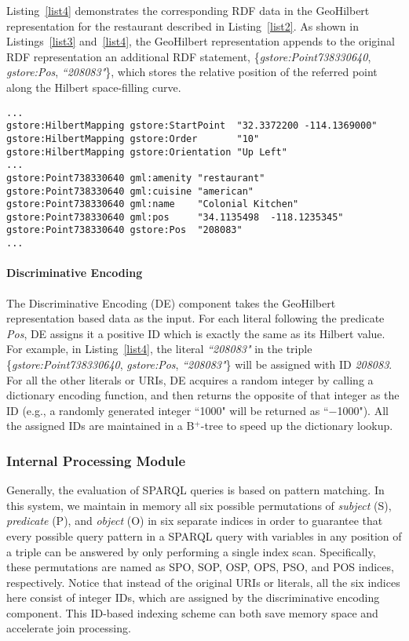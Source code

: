 Listing~\ref{list4} demonstrates the corresponding RDF data in the
GeoHilbert representation for the restaurant described in
Listing~\ref{list2}. As shown in Listings~\ref{list3}
and~\ref{list4}, the GeoHilbert representation appends to the
original RDF representation an additional RDF statement,
\{\emph{gstore:Point738330640}, \emph{gstore:Pos},
\emph{``208083"}\}, which stores the relative position of the
referred point along the Hilbert space-filling curve.


\begin{lstlisting}[caption={The GeoHilbert representation of the restaurant described in Listing~\ref{list2}.}, label={list4}]
...
gstore:HilbertMapping gstore:StartPoint  "32.3372200 -114.1369000"
gstore:HilbertMapping gstore:Order       "10"
gstore:HilbertMapping gstore:Orientation "Up Left"
...
gstore:Point738330640 gml:amenity "restaurant"
gstore:Point738330640 gml:cuisine "american"
gstore:Point738330640 gml:name    "Colonial Kitchen"
gstore:Point738330640 gml:pos     "34.1135498  -118.1235345"
gstore:Point738330640 gstore:Pos  "208083"
...
\end{lstlisting}


\paragraph{Discriminative Encoding}

The Discriminative Encoding (DE) component takes the GeoHilbert representation based data as the input. For each literal following the predicate \emph{Pos}, DE assigns it a positive ID which is exactly the same as its Hilbert value. For example, in Listing~\ref{list4}, the literal \emph{``208083"} in the triple \{\emph{gstore:Point738330640}, \emph{gstore:Pos}, \emph{``208083"}\} will be assigned with ID \emph{208083}. For all the other literals or URIs, DE acquires a random integer by calling a dictionary encoding function, and then returns the opposite of that integer as the ID (e.g., a randomly generated integer ``1000" will be returned as ``$-$1000"). All the assigned IDs are maintained in a B$^{+}$-tree to speed up the dictionary lookup.

\subsubsection{Internal Processing Module}

Generally, the evaluation of SPARQL queries is based on pattern matching. In this system, we maintain in memory all six possible permutations of \emph{subject} (S), \emph{predicate} (P), and \emph{object} (O) in six separate indices in order to guarantee that every possible query pattern in a SPARQL query with variables in any position of a triple can be answered by only performing a single index scan. Specifically, these permutations are named as SPO, SOP, OSP, OPS, PSO, and POS indices, respectively. Notice that instead of the original URIs or literals, all the six indices here consist of integer IDs, which are assigned by the discriminative encoding component. This ID-based indexing scheme can both save memory space and accelerate join processing.

